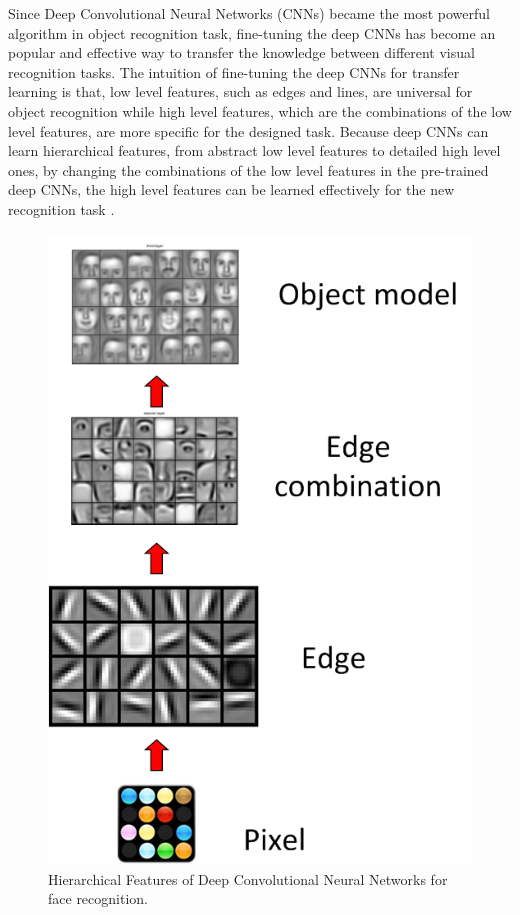 Since Deep Convolutional Neural Networks (CNNs) became the most powerful algorithm in object recognition task, fine-tuning the deep CNNs has become an popular and effective way to transfer the knowledge between different visual recognition tasks. The intuition of fine-tuning the deep CNNs for transfer learning is that, low level features, such as edges and lines, are universal for object recognition while high level features, which are the combinations of the low level features, are more specific for the designed task. Because deep CNNs can learn hierarchical features, from abstract low level features to detailed high level ones, by changing the combinations of the low level features in the pre-trained deep CNNs, the high level features can be learned effectively for the new recognition task \cite{farabet2013learning}.

\begin{figure}
	\centering
	\includegraphics[scale=.7]{relatedwork/fig/hierachy}
	\caption{Hierarchical Features of Deep Convolutional Neural Networks for face recognition.}
\end{figure}

